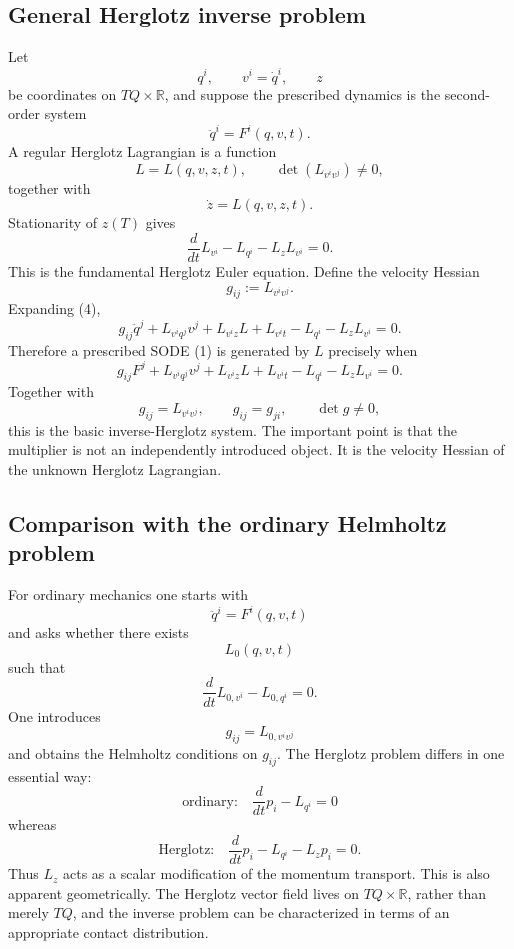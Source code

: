 \subsection{General Herglotz inverse problem}
Let
$$ q^i,\qquad v^i=\dot q^i,\qquad z $$
be coordinates on \(TQ\times\mathbb R\), and suppose the prescribed dynamics is the second-order system
\begin{equation}
 \ddot q^i=F^i(q,v,t). \tag{1} 
\end{equation}
A regular Herglotz Lagrangian is a function
\begin{equation}
 L=L(q,v,z,t), \qquad \det\left(L_{v^iv^j}\right)\neq0, \tag{2} 
\end{equation}
together with
\begin{equation}
 \dot z=L(q,v,z,t). \tag{3} 
\end{equation}
Stationarity of \(z(T)\) gives
\begin{equation}
 \frac{d}{dt}L_{v^i}-L_{q^i}-L_zL_{v^i}=0. \tag{4} 
\end{equation}
This is the fundamental Herglotz Euler equation.
Define the velocity Hessian
\begin{equation}
 g_{ij}:=L_{v^iv^j}. \tag{5} 
\end{equation}
Expanding (4),
\begin{equation}
 g_{ij}\ddot q^j +L_{v^iq^j}v^j +L_{v^iz}L +L_{v^it} -L_{q^i} -L_zL_{v^i}=0. \tag{6} 
\end{equation}
Therefore a prescribed SODE (1) is generated by \(L\) precisely when
\begin{equation}
 \boxed{ g_{ij}F^j +L_{v^iq^j}v^j +L_{v^iz}L +L_{v^it} -L_{q^i} -L_zL_{v^i}=0. } \tag{7} 
\end{equation}
Together with
\begin{equation}
 \boxed{g_{ij}=L_{v^iv^j},\qquad g_{ij}=g_{ji},\qquad \det g\neq0,} \tag{8} 
\end{equation}
this is the basic inverse-Herglotz system.
The important point is that the multiplier is not an independently introduced object. It is the velocity Hessian of the unknown Herglotz Lagrangian.

\subsection{Comparison with the ordinary Helmholtz problem}

For ordinary mechanics one starts with
$$ \ddot q^i=F^i(q,v,t) $$
and asks whether there exists
$$ L_0(q,v,t) $$
such that
$$ \frac d{dt}L_{0,v^i}-L_{0,q^i}=0. $$
One introduces
$$ g_{ij}=L_{0,v^iv^j} $$
and obtains the Helmholtz conditions on \(g_{ij}\).
The Herglotz problem differs in one essential way:
$$ \boxed{ \text{ordinary:}\quad \frac d{dt}p_i-L_{q^i}=0 } $$
whereas
$$ \boxed{ \text{Herglotz:}\quad \frac d{dt}p_i-L_{q^i}-L_zp_i=0. } $$
Thus \(L_z\) acts as a scalar modification of the momentum transport.
This is also apparent geometrically. The Herglotz vector field lives on \(TQ\times\mathbb R\), rather than merely \(TQ\), and the inverse problem can be characterized in terms of an appropriate contact distribution.


